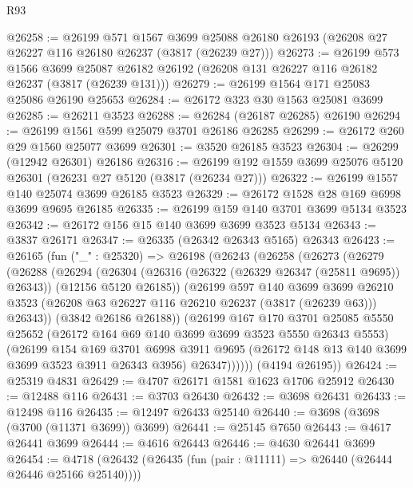 \begin{lexlean}{R93}
\begin{coremodule}
@26258 := @26199
    @571
    @1567
    @3699
    @25088
    @26180
    @26193
    (@26208 @27 @26227 @116 @26180 @26237 (@3817 (@26239 @27)))
@26273 := @26199
    @573
    @1566
    @3699
    @25087
    @26182
    @26192
    (@26208 @131 @26227 @116 @26182 @26237 (@3817 (@26239 @131)))
@26279 := @26199 @1564 @171 @25083 @25086 @26190 @25653
@26284 := @26172 @323 @30 @1563 @25081 @3699
@26285 := @26211 @3523
@26288 := @26284 (@26187 @26285) @26190
@26294 := @26199 @1561 @599 @25079 @3701 @26186 @26285
@26299 := @26172 @260 @29 @1560 @25077 @3699
@26301 := @3520 @26185 @3523
@26304 := @26299 (@12942 @26301) @26186
@26316 := @26199 @192 @1559 @3699 @25076 @5120 @26301 (@26231 @27 @5120 (@3817 (@26234 @27)))
@26322 := @26199 @1557 @140 @25074 @3699 @26185 @3523
@26329 := @26172 @1528 @28 @169 @6998 @3699 @9695 @26185
@26335 := @26199 @159 @140 @3701 @3699 @5134 @3523
@26342 := @26172 @156 @15 @140 @3699 @3699 @3523 @5134
@26343 := @3837 @26171
@26347 := @26335 (@26342 @26343 @5165) @26343
@26423 := @26165
    (fun ("_" : @25320) =>
    @26198
      (@26243
        (@26258
          (@26273
            (@26279
              (@26288
                (@26294
                  (@26304
                    (@26316 (@26322 (@26329 @26347 (@25811 @9695)) @26343))
                    (@12156 @5120 @26185))
                  (@26199
                    @597
                    @140
                    @3699
                    @3699
                    @26210
                    @3523
                    (@26208 @63 @26227 @116 @26210 @26237 (@3817 (@26239 @63)))
                    @26343))
                (@3842 @26186 @26188))
              (@26199
                @167
                @170
                @3701
                @25085
                @5550
                @25652
                (@26172 @164 @69 @140 @3699 @3699 @3523 @5550 @26343 @5553)
                (@26199
                  @154
                  @169
                  @3701
                  @6998
                  @3911
                  @9695
                  (@26172 @148 @13 @140 @3699 @3699 @3523 @3911 @26343 @3956)
                  @26347))))))
      (@4194 @26195))
@26424 := @25319 @4831
@26429 := @4707 @26171 @1581 @1623 @1706 @25912
@26430 := @12488 @116
@26431 := @3703 @26430
@26432 := @3698 @26431
@26433 := @12498 @116
@26435 := @12497 @26433 @25140
@26440 := @3698 (@3698 (@3700 (@11371 @3699)) @3699)
@26441 := @25145 @7650
@26443 := @4617 @26441 @3699
@26444 := @4616 @26443
@26446 := @4630 @26441 @3699
@26454 := @4718 (@26432 (@26435 (fun (pair : @11111) => @26440 (@26444 @26446 @25166 @25140))))

\end{coremodule}
\end{lexlean}
